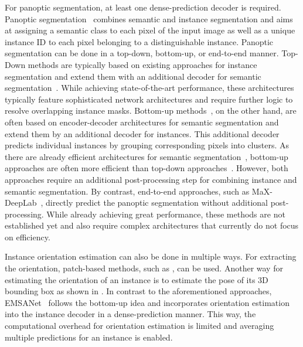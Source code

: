 \documentclass[conference]{IEEEtran}
\begin{document}
For panoptic segmentation, at least one dense-prediction decoder is required.
Panoptic segmentation~\cite{Panopticsegmentation-cvpr2019} combines semantic and instance segmentation and aims at assigning a semantic class to each pixel of the input image as well as a unique instance ID to each pixel belonging to a distinguishable instance.
Panoptic segmentation can be done in a top-down, bottom-up, or end-to-end manner.
Top-Down methods are typically based on existing approaches for instance segmentation and extend them with an additional decoder for semantic segmentation~\cite{PanopticFPN-cvpr2019, UPSNet-cvpr2019}.
While achieving state-of-the-art performance, these architectures typically feature sophisticated network architectures and require further logic to resolve overlapping instance masks.
Bottom-up methods~\cite{DeeperLab-arxiv2019, PanopticDeeplab-cvpr2020, emsanet2022ijcnn}, on the other hand, are often based on encoder-decoder architectures for semantic segmentation and extend them by an additional decoder for instances.
This additional decoder predicts individual instances by grouping corresponding pixels into clusters.
As there are already efficient architectures for semantic segmentation~\cite{SwiftNet-cvpr2019, esanet2021icra}, bottom-up approaches are often more efficient than top-down approaches~\cite{emsanet2022ijcnn}.
However, both approaches require an additional post-processing step for combining instance and semantic segmentation.
By contrast, end-to-end approaches, such as MaX-DeepLab~\cite{Max-Deeplab-cvpr2021}, directly predict the panoptic segmentation without additional post-processing.
While already achieving great performance, these methods are not established yet and also require complex architectures that currently do not focus on efficiency.

Instance orientation estimation can also be done in multiple ways.
For extracting the orientation, patch-based methods, such as \cite{Biternion-gcpr2015, DeepOrientation-iros2019, MTPersonPerception-iros2020}, can be used.
Another way for estimating the orientation of an instance is to estimate the pose of its 3D bounding box as shown in \cite{3DBBox-Estimation-cvpr2017, monocular3DObjectDetection-cvpr2019, ObjectsAreDifferent3D-cvpr2021}.
In contrast to the aforementioned approaches, EMSANet~\cite{emsanet2022ijcnn} follows the bottom-up idea and incorporates orientation estimation into the instance decoder in a dense-prediction manner.
This way, the computational overhead for orientation estimation is limited and averaging multiple predictions for an instance is enabled.
\end{document}
